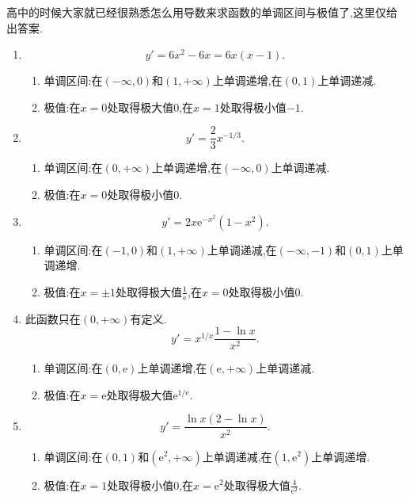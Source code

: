\begin{solution}
    高中的时候大家就已经很熟悉怎么用导数来求函数的单调区间与极值了,这里仅给出答案.
    \begin{enumerate}
        \item $$y' = 6x^2 - 6x = 6x(x-1).$$
              \begin{enumerate}
                  \item[] 单调区间:在$(-\infty,0)$和$(1,+\infty)$上单调递增,在$(0,1)$上单调递减.
                  \item[] 极值:在$x = 0$处取得极大值$0$,在$x = 1$处取得极小值$-1$.
              \end{enumerate}
        \item $$y' = \frac{2}{3}x^{-1/3}.$$
              \begin{enumerate}
                  \item[] 单调区间:在$(0,+\infty)$上单调递增,在$(-\infty,0)$上单调递减.
                  \item[] 极值:在$x = 0$处取得极小值$0$.
              \end{enumerate}
        \item $$y' = 2x\mathrm{e}^{-x^2}(1-x^2).$$
              \begin{enumerate}
                  \item[] 单调区间:在$(-1,0)$和$(1,+\infty)$上单调递减,在$(-\infty,-1)$和$(0,1)$上单调递增.
                  \item[] 极值:在$x = \pm1$处取得极大值$\frac{1}{\mathrm{e}}$,在$x = 0$处取得极小值$0$.
              \end{enumerate}
        \item 此函数只在$(0,+\infty)$有定义.
              $$y' = x^{1/x} \frac{1 - \ln x}{x^2}.$$
              \begin{enumerate}
                  \item[] 单调区间:在$(0,\mathrm{e})$上单调递增,在$(\mathrm{e},+\infty)$上单调递减.
                  \item[] 极值:在$x = \mathrm{e}$处取得极大值$\mathrm{e}^{1/\mathrm{e}}$.
              \end{enumerate}
        \item $$y' = \frac{\ln x (2 - \ln x)}{x^2}.$$
              \begin{enumerate}
                  \item[] 单调区间:在$(0,1)$和$(\mathrm{e}^2,+\infty)$上单调递减,在$(1,\mathrm{e}^2)$上单调递增.
                  \item[] 极值:在$x = 1$处取得极小值$0$,在$x = \mathrm{e}^2$处取得极大值$\frac{4}{\mathrm{e}^2}$.

\end{enumerate}
\end{enumerate}
\end{solution}
